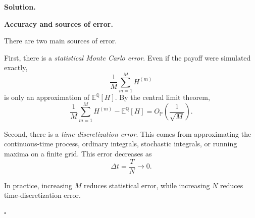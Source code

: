 \documentclass[11pt]{article}
\theoremstyle{plain}
\newcommand{\1}{\mathbf{1}}
\theoremstyle{definition}
\newenvironment{solution}
{\par\medskip\noindent\textbf{Solution.}\par\medskip}
{\hfill$\square$\par\medskip}
\newenvironment{solutionpart}[1]
{\par\medskip\noindent\textbf{#1.}\par\smallskip}
{\par\medskip}
\begin{document}
\begin{solution}
\begin{solutionpart}{Accuracy and sources of error}

There are two main sources of error.

First, there is a \emph{statistical Monte Carlo error}. Even if the payoff were simulated exactly,
\[
\frac1M\sum_{m=1}^M H^{(m)}
\]
is only an approximation of $\mathbb E^{\mathbb Q}[H]$. By the central limit theorem,
\[
\frac1M\sum_{m=1}^M H^{(m)}
-
\mathbb E^{\mathbb Q}[H]
=
O_{\mathbb P}\left(\frac1{\sqrt M}\right).
\]

Second, there is a \emph{time-discretization error}. This comes from approximating the continuous-time
process, ordinary integrals, stochastic integrals, or running maxima on a finite grid. This error decreases
as
\[
\Delta t=\frac{T}{N}\to0.
\]

In practice, increasing $M$ reduces statistical error, while increasing $N$ reduces time-discretization error.
\end{solutionpart}
\end{solution}
\end{document}
